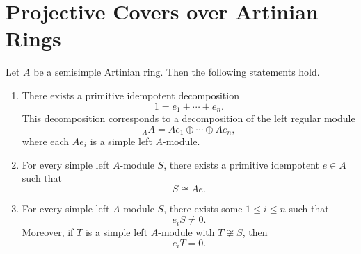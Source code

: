 \section{Projective Covers over Artinian Rings}

\begin{lemma}\label{lem:primitive-decomposition-semisimple-artinian}
    Let $A$ be a semisimple Artinian ring. Then the following statements hold.

    \begin{enumerate}
        \item There exists a primitive idempotent decomposition
              \[
                  1=e_1+\cdots+e_n .
              \]
              This decomposition corresponds to a decomposition of the left regular module
              \[
                  {}_A A = Ae_1\oplus \cdots \oplus Ae_n,
              \]
              where each $Ae_i$ is a simple left $A$-module.

        \item For every simple left $A$-module $S$, there exists a primitive idempotent
              $e\in A$ such that
              \[
                  S\cong Ae .
              \]

        \item For every simple left $A$-module $S$, there exists some $1\le i\le n$
              such that
              \[
                  e_iS\neq 0.
              \]
              Moreover, if $T$ is a simple left $A$-module with $T\not\cong S$, then
              \[
                  e_iT=0.
              \]
    \end{enumerate}
\end{lemma}

